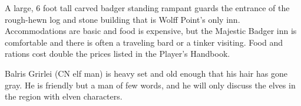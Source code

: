 A large, 6 foot tall carved badger standing rampant guards the entrance of the rough-hewn log and stone building that is Wolff Point's only inn.
Accommodations are basic and food is expensive, but the Majestic Badger inn is comfortable and there is often a traveling bard or a tinker visiting.
Food and rations cost double the prices listed in the Player's Handbook.

Balris Grirlei (CN elf man) is heavy set and old enough that his hair has gone gray.
He is friendly but a man of few words, and he will only discuss the elves in the region with elven characters.
